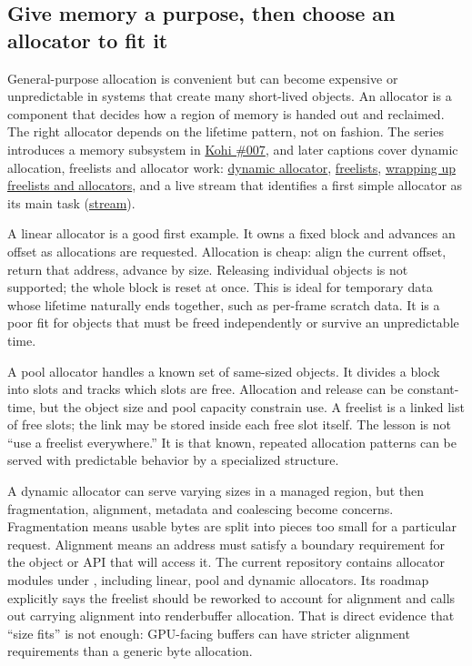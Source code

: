 \subsection{Give memory a purpose, then choose an allocator to fit it}\label{05-engine-i-ch014-give-memory-a-purpose-then-choose-an-allocator-to-fit-it}

\hypertarget{05-engine-i-ch014-give-memory-a-purpose-then-choose-an-allocator-to-fit-it}{}

General-purpose allocation is convenient but can become expensive or unpredictable in systems that create many short-lived objects. An allocator is a component that decides how a region of memory is handed out and reclaimed. The right allocator depends on the lifetime pattern, not on fashion. The series introduces a memory subsystem in \href{https://www.youtube.com/watch?v=_GBUCo2FbUk}{Kohi \#007}, and later captions cover dynamic allocation, freelists and allocator work: \href{https://www.youtube.com/watch?v=BSBFBWwG8Ds}{dynamic allocator}, \href{https://www.youtube.com/watch?v=sP7xRUyP3e0}{freelists}, \href{https://www.youtube.com/watch?v=SNDJ-rGJd5A}{wrapping up freelists and allocators}, and a live stream that identifies a first simple allocator as its main task (\href{https://www.youtube.com/watch?v=3ZFcvBjRFN0}{stream}).

A linear allocator is a good first example. It owns a fixed block and advances an offset as allocations are requested. Allocation is cheap: align the current offset, return that address, advance by size. Releasing individual objects is not supported; the whole block is reset at once. This is ideal for temporary data whose lifetime naturally ends together, such as per-frame scratch data. It is a poor fit for objects that must be freed independently or survive an unpredictable time.

A pool allocator handles a known set of same-sized objects. It divides a block into slots and tracks which slots are free. Allocation and release can be constant-time, but the object size and pool capacity constrain use. A freelist is a linked list of free slots; the link may be stored inside each free slot itself. The lesson is not ``use a freelist everywhere.'' It is that known, repeated allocation patterns can be served with predictable behavior by a specialized structure.

A dynamic allocator can serve varying sizes in a managed region, but then fragmentation, alignment, metadata and coalescing become concerns. Fragmentation means usable bytes are split into pieces too small for a particular request. Alignment means an address must satisfy a boundary requirement for the object or API that will access it. The current repository contains allocator modules under , including linear, pool and dynamic allocators. Its roadmap explicitly says the freelist should be reworked to account for alignment and calls out carrying alignment into renderbuffer allocation. That is direct evidence that ``size fits'' is not enough: GPU-facing buffers can have stricter alignment requirements than a generic byte allocation.

